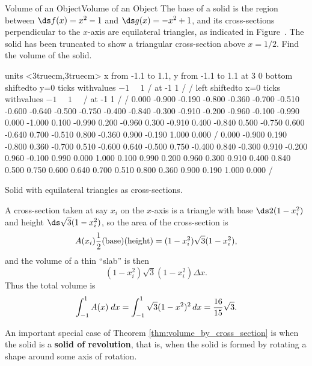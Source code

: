 \begin{example}{Volume of an Object}{Volume of an Object}
The base of a solid is the region between $\ds f(x)=x^2-1$ and
$\ds g(x)=-x^2+1$, and its cross-sections perpendicular to the $x$-axis 
are equilateral triangles, as indicated in
Figure~.
The solid has been truncated to show a triangular
cross-section above $x=1/2$.
Find the volume of the solid.
\end{example}

\figure[H]
\centerline{\vbox{\beginpicture
\normalgraphs
\setcoordinatesystem units <3truecm,3truecm>
\setplotarea x from -1.1 to 1.1, y from -1.1 to 1.1
 at 3 0
\axis bottom shiftedto y=0 ticks withvalues {$-1\quad$} {$1$} / at -1 1 / /
\axis left shiftedto x=0 ticks withvalues {$-1\quad$} {$1\quad$} / at -1 1 / /
 0.000 -0.900 -0.190 -0.800 -0.360 -0.700 -0.510 -0.600 -0.640 
-0.500 -0.750 -0.400 -0.840 -0.300 -0.910 -0.200 -0.960 -0.100 -0.990 
0.000 -1.000 0.100 -0.990 0.200 -0.960 0.300 -0.910 0.400 -0.840 
0.500 -0.750 0.600 -0.640 0.700 -0.510 0.800 -0.360 0.900 -0.190 
1.000 0.000 /
 0.000 -0.900 0.190 -0.800 0.360 -0.700 0.510 -0.600 0.640 
-0.500 0.750 -0.400 0.840 -0.300 0.910 -0.200 0.960 -0.100 0.990 
0.000 1.000 0.100 0.990 0.200 0.960 0.300 0.910 0.400 0.840 
0.500 0.750 0.600 0.640 0.700 0.510 0.800 0.360 0.900 0.190 
1.000 0.000 /
\endpicture}}
\caption
{Solid with equilateral triangles as cross-sections.\label{fig:triangular cross-sections}}
\endfigure

\begin{solution}
A cross-section taken at say $ x_i$ on the $x$-axis is a triangle with
base $\ds 2(1-x_i^2)$ and height $\ds \sqrt3(1-x_i^2)$, so the area of the
cross-section is 
$$
 A(x_i) {1\over2}(\hbox{base})(\hbox{height})=
  (1-x_i^2)\sqrt3(1-x_i^2),
$$
and the volume of a thin ``slab'' is then
$$(1-x_i^2)\sqrt3(1-x_i^2)\Delta x.$$
Thus the total volume is 
$$\int_{-1}^1 A(x) \; dx = \int_{-1}^1 \sqrt3(1-x^2)^2\,dx={16\over15}\sqrt3.$$
\vskip-10pt
\end{solution}
%
%
%
%
An important special case of Theorem \ref{thm:volume_by_cross_section} is when the solid is a \textbf{solid of revolution}, that is, when the solid is formed by rotating a shape around some axis of rotation.

